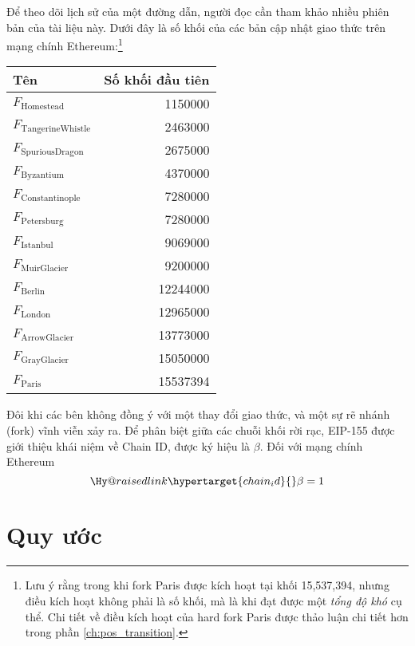 \documentclass[9pt,oneside]{amsart}
\makeatletter
\newcommand{\linkdest}[1]{\Hy@raisedlink{\hypertarget{#1}{}}}
\makeatother
\begin{document}
\begin{multicols}{2}
Để theo dõi lịch sử của một đường dẫn, người đọc cần tham khảo nhiều phiên bản của tài liệu này. Dưới đây là số khối của các bản cập nhật giao thức trên mạng chính Ethereum:\footnote{Lưu ý rằng trong khi fork Paris được kích hoạt tại khối 15,537,394, nhưng điều kích hoạt không phải là số khối, mà là khi đạt được một \textit{tổng độ khó} cụ thể. Chi tiết về điều kích hoạt của hard fork Paris được thảo luận chi tiết hơn trong phần \ref{ch:pos_transition}.}
\par
\begin{center}
\begin{tabular}{lr}
\toprule
Tên & Số khối đầu tiên \\
\midrule
$F_{\mathrm{Homestead}}$         &  1150000 \\
$F_{\mathrm{Tangerine Whistle}}$ &  2463000 \\
$F_{\mathrm{Spurious Dragon}}$   &  2675000 \\
$F_{\mathrm{Byzantium}}$         &  4370000 \\
$F_{\mathrm{Constantinople}}$    &  7280000 \\
$F_{\mathrm{Petersburg}}$        &  7280000 \\
$F_{\mathrm{Istanbul}}$          &  9069000 \\
$F_{\mathrm{Muir Glacier}}$      &  9200000 \\
$F_{\mathrm{Berlin}}$            & 12244000 \\
$F_{\mathrm{London}}$            & 12965000 \\
$F_{\mathrm{Arrow Glacier}}$     & 13773000 \\
$F_{\mathrm{Gray Glacier}}$      & 15050000 \\
$F_{\mathrm{Paris}}$             & 15537394 \\
\bottomrule
\end{tabular}
\end{center}
\par

Đôi khi các bên không đồng ý với một thay đổi giao thức, và một sự rẽ nhánh (fork) vĩnh viễn xảy ra. Để phân biệt giữa các chuỗi khối rời rạc, EIP-155 được \cite{EIP-155} giới thiệu khái niệm về Chain ID, được ký hiệu là $\beta$. 
Đối với mạng chính Ethereum
\begin{equation}
  \linkdest{chain_id}
  \beta = 1
\end{equation}

\section{Quy ước}\label{ch:conventions}


\end{multicols}
\end{document}
